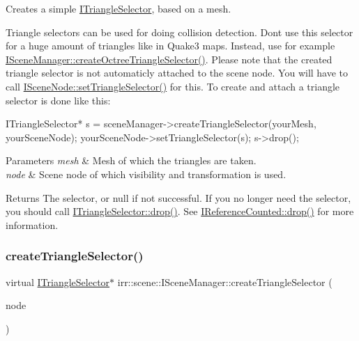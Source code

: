 Creates a simple \hyperlink{classirr_1_1scene_1_1ITriangleSelector}{I\+Triangle\+Selector}, based on a mesh. 

Triangle selectors can be used for doing collision detection. Don\textquotesingle{}t use this selector for a huge amount of triangles like in Quake3 maps. Instead, use for example \hyperlink{classirr_1_1scene_1_1ISceneManager_a4ed7d3b34f4d0c70395b6d464fe32b96}{I\+Scene\+Manager\+::create\+Octree\+Triangle\+Selector()}. Please note that the created triangle selector is not automaticly attached to the scene node. You will have to call \hyperlink{classirr_1_1scene_1_1ISceneNode_a87fb52ec54bf3ae117340d8defd1255f}{I\+Scene\+Node\+::set\+Triangle\+Selector()} for this. To create and attach a triangle selector is done like this\+: 
\begin{DoxyCode}
ITriangleSelector* s = sceneManager->createTriangleSelector(yourMesh,
        yourSceneNode);
yourSceneNode->setTriangleSelector(s);
s->drop();
\end{DoxyCode}
 
\begin{DoxyParams}{Parameters}
{\em mesh} & Mesh of which the triangles are taken. \\
\hline
{\em node} & Scene node of which visibility and transformation is used. \\
\hline
\end{DoxyParams}
\begin{DoxyReturn}{Returns}
The selector, or null if not successful. If you no longer need the selector, you should call \hyperlink{classirr_1_1IReferenceCounted_a03856a09355b89d178090c4a5f738543}{I\+Triangle\+Selector\+::drop()}. See \hyperlink{classirr_1_1IReferenceCounted_a03856a09355b89d178090c4a5f738543}{I\+Reference\+Counted\+::drop()} for more information. 
\end{DoxyReturn}
\mbox{\label{classirr_1_1scene_1_1ISceneManager_abc1ecc9a60abb40e7ffddbd72c077231}} 
\subsubsection{\texorpdfstring{create\+Triangle\+Selector()}{createTriangleSelector()}\hspace{0.1cm}{\footnotesize\ttfamily [3/4]}}
{\footnotesize\ttfamily virtual \hyperlink{classirr_1_1scene_1_1ITriangleSelector}{I\+Triangle\+Selector}$\ast$ irr\+::scene\+::\+I\+Scene\+Manager\+::create\+Triangle\+Selector (\begin{DoxyParamCaption}\item[{\hyperlink{classirr_1_1scene_1_1IAnimatedMeshSceneNode}{I\+Animated\+Mesh\+Scene\+Node} $\ast$}]{node }\end{DoxyParamCaption})\hspace{0.3cm}{\ttfamily [pure virtual]}}



